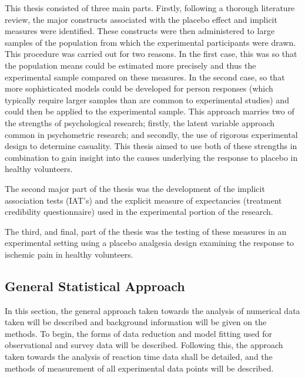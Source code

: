 This thesis consisted of three main parts. Firstly, following a thorough literature review, the major constructs associated with the placebo effect and implicit measures were identified. These constructs were then administered to large samples of the population from which the experimental participants were drawn. This procedure was carried out for two reasons. In the first case, this was so that the population means could be estimated more precisely and thus the experimental sample compared on these measures.  In the second case, so that more sophisticated models could be developed for person responses (which typically require larger samples than are common to experimental studies) and could then be applied to the experimental sample. This approach marries two of the strengths of psychological research; firstly, the latent variable approach common in psychometric research; and secondly, the use of rigorous experimental design to determine casuality. This thesis aimed to use both of these strengths in combination to gain insight into the causes underlying the response to placebo in healthy volunteers.

The second major part of the thesis was the development of the implicit association tests (IAT's) and the explicit measure of expectancies (treatment credibility questionnaire) used in the experimental portion of the research. 

The third, and final, part of the thesis was the testing of these measures in an experimental setting using a placebo analgesia design examining the response to ischemic pain in healthy volunteers. 

\subsection{General Statistical Approach}

In this section, the general approach taken towards the analysis of numerical data taken will be described and background information will be given on the methods.
To begin, the forms of data reduction and model fitting used for observational and survey data will be described. Following this, the approach taken towards the analysis of reaction time data shall be detailed, and the methods of measurement of all experimental data points will be described.




